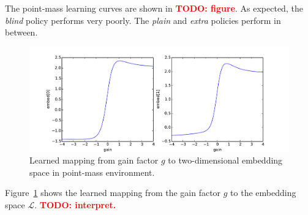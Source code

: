 \documentclass{article}
\newcommand{\TODO}[1]{\textcolor{red}{\textbf{TODO: #1}}}
\newcommand{\cL}{\mathcal{L}}
\begin{document}
The point-mass learning curves are shown in \TODO{figure}.
As expected, the \emph{blind} policy performs very poorly.
The \emph{plain} and \emph{extra} policies perform in between.

\begin{figure}
\centering
\includegraphics[width=\textwidth]{pointmass_embed_mapping.pdf}
\caption{
Learned mapping from gain factor $g$ to two-dimensional embedding space in point-mass environment.
}
\label{fig:embed-mapping}
\end{figure}
Figure~\ref{fig:embed-mapping} shows the learned mapping from the gain factor $g$
to the embedding space $\cL$.
\TODO{interpret.}
\end{document}

